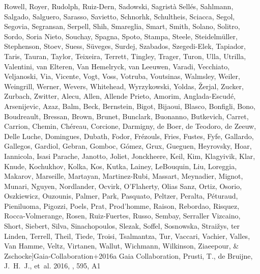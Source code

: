\documentclass{aa}
\begin{document}
\begin{thebibliography}{242}
{  {Rowell}, {Royer}, {Rudolph}, {Ruiz-Dern}, {Sadowski}, {Sagrist{\`a}
  Sell{\'e}s}, {Sahlmann}, {Salgado}, {Salguero}, {Sarasso}, {Savietto},
  {Schnorhk}, {Schultheis}, {Sciacca}, {Segol}, {Segovia}, {Segransan},
  {Serpell}, {Shih}, {Smareglia}, {Smart}, {Smith}, {Solano}, {Solitro},
  {Sordo}, {Soria Nieto}, {Souchay}, {Spagna}, {Spoto}, {Stampa}, {Steele},
  {Steidelm{\"u}ller}, {Stephenson}, {Stoev}, {Suess}, {S{\"u}veges}, {Surdej},
  {Szabados}, {Szegedi-Elek}, {Tapiador}, {Taris}, {Tauran}, {Taylor},
  {Teixeira}, {Terrett}, {Tingley}, {Trager}, {Turon}, {Ulla}, {Utrilla},
  {Valentini}, {van Elteren}, {Van Hemelryck}, {van Leeuwen}, {Varadi},
  {Vecchiato}, {Veljanoski}, {Via}, {Vicente}, {Vogt}, {Voss}, {Votruba},
  {Voutsinas}, {Walmsley}, {Weiler}, {Weingrill}, {Werner}, {Wevers},
  {Whitehead}, {Wyrzykowski}, {Yoldas}, {{\v Z}erjal}, {Zucker}, {Zurbach},
  {Zwitter}, {Alecu}, {Allen}, {Allende Prieto}, {Amorim},
  {Anglada-Escud{\'e}}, {Arsenijevic}, {Azaz}, {Balm}, {Beck}, {Bernstein},
  {Bigot}, {Bijaoui}, {Blasco}, {Bonfigli}, {Bono}, {Boudreault}, {Bressan},
  {Brown}, {Brunet}, {Bunclark}, {Buonanno}, {Butkevich}, {Carret}, {Carrion},
  {Chemin}, {Ch{\'e}reau}, {Corcione}, {Darmigny}, {de Boer}, {de Teodoro}, {de
  Zeeuw}, {Delle Luche}, {Domingues}, {Dubath}, {Fodor}, {Fr{\'e}zouls},
  {Fries}, {Fustes}, {Fyfe}, {Gallardo}, {Gallegos}, {Gardiol}, {Gebran},
  {Gomboc}, {G{\'o}mez}, {Grux}, {Gueguen}, {Heyrovsky}, {Hoar}, {Iannicola},
  {Isasi Parache}, {Janotto}, {Joliet}, {Jonckheere}, {Keil}, {Kim},
  {Klagyivik}, {Klar}, {Knude}, {Kochukhov}, {Kolka}, {Kos}, {Kutka}, {Lainey},
  {LeBouquin}, {Liu}, {Loreggia}, {Makarov}, {Marseille}, {Martayan},
  {Martinez-Rubi}, {Massart}, {Meynadier}, {Mignot}, {Munari}, {Nguyen},
  {Nordlander}, {Ocvirk}, {O'Flaherty}, {Olias Sanz}, {Ortiz}, {Osorio},
  {Oszkiewicz}, {Ouzounis}, {Palmer}, {Park}, {Pasquato}, {Peltzer}, {Peralta},
  {P{\'e}turaud}, {Pieniluoma}, {Pigozzi}, {Poels}, {Prat}, {Prod'homme},
  {Raison}, {Rebordao}, {Risquez}, {Rocca-Volmerange}, {Rosen}, {Ruiz-Fuertes},
  {Russo}, {Sembay}, {Serraller Vizcaino}, {Short}, {Siebert}, {Silva},
  {Sinachopoulos}, {Slezak}, {Soffel}, {Sosnowska}, {Strai{\v z}ys}, {ter
  Linden}, {Terrell}, {Theil}, {Tiede}, {Troisi}, {Tsalmantza}, {Tur},
  {Vaccari}, {Vachier}, {Valles}, {Van Hamme}, {Veltz}, {Virtanen}, {Wallut},
  {Wichmann}, {Wilkinson}, {Ziaeepour}, \&
  {Zschocke}}]{Gaia-Collaboration+2016a}
{Gaia Collaboration}, {Prusti}, T., {de Bruijne}, J.~H.~J., {et~al.}
  2016{}, \aap, 595, A1


\end{thebibliography}
\end{document}
